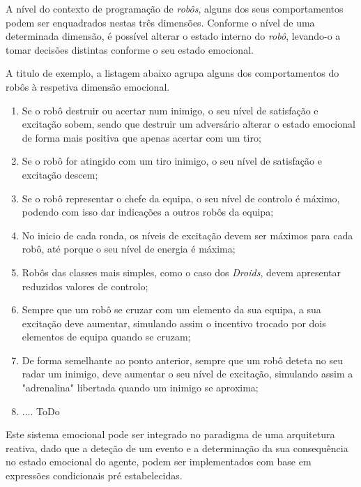 A nível do contexto de programação de \textit{robôs}, alguns dos seus comportamentos podem ser enquadrados nestas três dimensões. 
Conforme o nível de uma determinada dimensão, é possível alterar o estado interno do \textit{robô}, levando-o a tomar decisões distintas conforme o seu estado emocional. 

A titulo de exemplo, a listagem abaixo agrupa alguns dos comportamentos do robôs à respetiva dimensão emocional. 

\begin{enumerate}

    \item Se o robô destruir ou acertar num inimigo, o seu nível de satisfação e excitação sobem, sendo que destruir um adversário alterar o estado emocional de forma mais positiva que apenas acertar com um tiro;
    
    \item Se o robô for atingido com um tiro inimigo, o seu nível de satisfação e excitação descem;
    
    \item Se o robô representar o chefe da equipa, o seu nível de controlo é máximo, podendo com isso dar indicações a outros robôs da equipa;
    
    \item No inicio de cada ronda, os níveis de excitação devem ser máximos para cada robô, até porque o seu nível de energia é máxima;
    
    \item Robôs das classes mais simples, como o caso dos \textit{Droids}, devem apresentar reduzidos valores de controlo;
    
    \item Sempre que um robô se cruzar com um elemento da sua equipa, a sua excitação deve aumentar, simulando assim o incentivo trocado por dois elementos de equipa quando se cruzam; 
    
    \item De forma semelhante ao ponto anterior, sempre que um robô deteta no seu radar um inimigo, deve aumentar o seu nível de excitação, simulando assim a "adrenalina" libertada quando um inimigo se aproxima; 
    
    \item .... ToDo

\end{enumerate}

Este sistema emocional pode ser integrado no paradigma de uma arquitetura reativa, dado que a deteção de um evento e a determinação da sua consequência no estado emocional do agente, podem ser implementados com base em expressões condicionais pré estabelecidas. 


